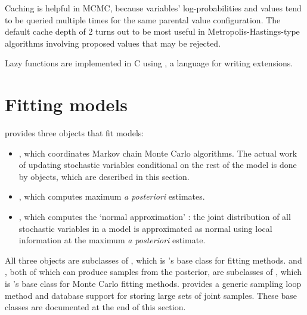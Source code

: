 \documentclass[]{jss}
\begin{document}
Caching is helpful in MCMC, because variables' log-probabilities and values tend to be queried multiple times for the same parental value configuration. The default cache depth of 2 turns out to be most useful in Metropolis-Hastings-type algorithms involving proposed values that may be rejected.

Lazy functions are implemented in C using  \citep{pyrex}, a language for writing  extensions.



\section[Fitting Models]{Fitting models}
\label{chap:modelfitting}

 provides three objects that fit models:
\begin{itemize}
    \item {}, which coordinates Markov chain Monte Carlo algorithms. The actual work of updating stochastic variables conditional on the rest of the model is done by  objects, which are described in this section.
    \item {}, which computes maximum \emph{a posteriori} estimates.
    \item {}, which computes the `normal approximation' \citep{gelman}: the joint distribution of all stochastic variables in a model is approximated as normal using local information at the maximum \emph{a posteriori} estimate.
\end{itemize}

All three objects are subclasses of , which is 's base class for fitting methods.  and , both of which can produce samples from the posterior, are subclasses of , which is 's base class for Monte Carlo fitting methods.  provides a generic sampling loop method and database support for storing large sets of joint samples. These base classes are documented at the end of this section. %
\end{document}
